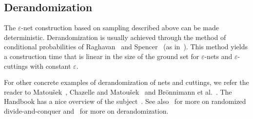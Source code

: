 \subsection{Derandomization}

The
\(\varepsilon\)-net
construction based on sampling
described above can be made deterministic.
%
Derandomization is usually achieved through
the method of conditional probabilities of Raghavan~\cite{Rag88}
and Spencer~\cite{Spe94} (as in~\cite{C93}).
%
This method yields a construction time that is linear in the size of
the ground set for \(\varepsilon\)-nets and \(\varepsilon\)-cuttings with
constant \(\varepsilon\).
%


For other concrete examples of derandomization of nets and cuttings, we
refer the reader to Matou\v{s}ek~\cite{M96}, Chazelle and
Matou\v{s}ek~\cite{CM96} and Brönnimann et al.~\cite{BCM99}.
%
The Handbook has a nice overview of the
subject~\cite[Section~40.7]{CMR04}.
See also~\cite[Section~40.1]{CMR04} for more on randomized divide-and-conquer
and~\cite[Section~40.6]{CMR04} for more on derandomization.
%
